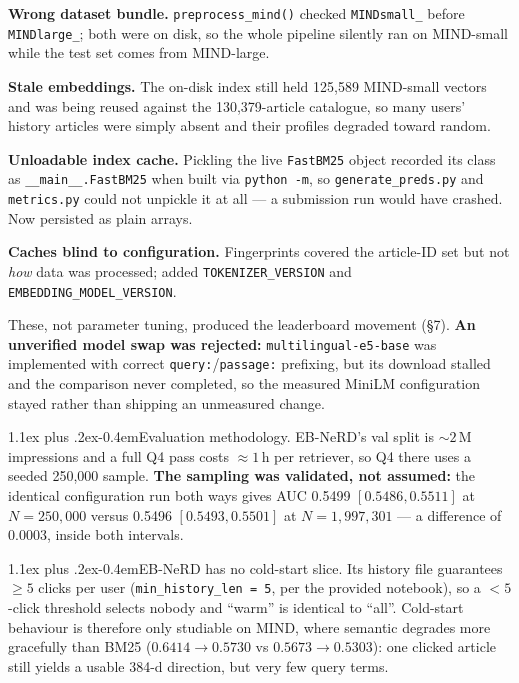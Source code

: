 \documentclass[10pt,a4paper]{article}
\makeatletter
\renewcommand\subsection{\@startsection{subsection}{2}{0pt}%
  {1.1ex plus .2ex}{-0.4em}{\normalfont\bfseries}}
\newenvironment{tightitem}
  {\begin{list}{\textbullet}{%
     \setlength{\leftmargin}{1.1em}\setlength{\labelwidth}{0.7em}%
     \setlength{\labelsep}{0.4em}\setlength{\itemsep}{1pt}%
     \setlength{\parsep}{0pt}\setlength{\topsep}{2pt}%
     \setlength{\partopsep}{0pt}}}
  {\end{list}}
\makeatother
\begin{document}
\begin{tightitem}
\item \textbf{Wrong dataset bundle.} \texttt{preprocess\_mind()} checked
\texttt{MINDsmall\_} before \texttt{MINDlarge\_}; both were on disk, so the whole pipeline
silently ran on MIND-small while the test set comes from MIND-large.
\item \textbf{Stale embeddings.} The on-disk index still held 125{,}589 MIND-small vectors
and was being reused against the 130{,}379-article catalogue, so many users' history
articles were simply absent and their profiles degraded toward random.
\item \textbf{Unloadable index cache.} Pickling the live \texttt{FastBM25} object recorded
its class as \texttt{\_\_main\_\_.FastBM25} when built via \texttt{python -m}, so
\texttt{generate\_preds.py} and \texttt{metrics.py} could not unpickle it at all --- a
submission run would have crashed. Now persisted as plain arrays.
\item \textbf{Caches blind to configuration.} Fingerprints covered the article-ID set but
not \emph{how} data was processed; added \texttt{TOKENIZER\_VERSION} and
\texttt{EMBEDDING\_MODEL\_VERSION}.
\end{tightitem}

These, not parameter tuning, produced the leaderboard movement (\S7). \textbf{An unverified
model swap was rejected:} \texttt{multilingual-e5-base} was implemented with correct
\texttt{query:}/\texttt{passage:} prefixing, but its download stalled and the comparison
never completed, so the measured MiniLM configuration stayed rather than shipping an
unmeasured change.

\subsection{Evaluation methodology.}
EB-NeRD's val split is ${\sim}2$\,M impressions and a full Q4 pass costs ${\approx}1$\,h per
retriever, so Q4 there uses a seeded 250{,}000 sample. \textbf{The sampling was validated,
not assumed:} the identical configuration run both ways gives AUC 0.5499 $[0.5486, 0.5511]$
at $N{=}250{,}000$ versus 0.5496 $[0.5493, 0.5501]$ at $N{=}1{,}997{,}301$ --- a difference
of 0.0003, inside both intervals.

\subsection{EB-NeRD has no cold-start slice.}
Its history file guarantees $\geq5$ clicks per user (\texttt{min\_history\_len = 5}, per the
provided notebook), so a $<5$-click threshold selects nobody and ``warm'' is identical to
``all''. Cold-start behaviour is therefore only studiable on MIND, where semantic degrades
more gracefully than BM25 ($0.6414\!\rightarrow\!0.5730$ vs $0.5673\!\rightarrow\!0.5303$):
one clicked article still yields a usable 384-d direction, but very few query terms.
\end{document}
